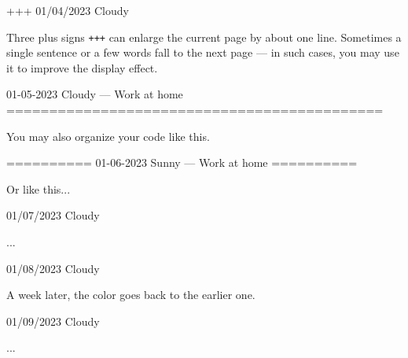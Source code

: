\documentclass[11pt, paperstyle=light yellow, color entry, month-day-year]{jwjournal}
\begin{document}
+++
01/04/2023  Cloudy

  Three plus signs \texttt{+++} can enlarge the current page by about one line. Sometimes a single sentence or a few words fall to the next page --- in such cases, you may use it to improve the display effect.



01-05-2023    Cloudy        --- Work at home
============================================

You may also organize your code like this.


==========
01-06-2023    Sunny         --- Work at home
==========

Or like this...



01/07/2023  Cloudy

  ...



01/08/2023  Cloudy

  A week later, the color goes back to the earlier one.



01/09/2023  Cloudy

  ...
\end{document}
